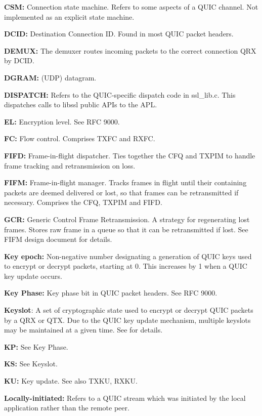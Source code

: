 {\bfseries{CSM\+:}} Connection state machine. Refers to some aspects of a QUIC channel. Not implemented as an explicit state machine.

{\bfseries{DCID\+:}} Destination Connection ID. Found in most QUIC packet headers.

{\bfseries{DEMUX\+:}} The demuxer routes incoming packets to the correct connection QRX by DCID.

{\bfseries{DGRAM\+:}} (UDP) datagram.

{\bfseries{DISPATCH\+:}} Refers to the QUIC-\/specific dispatch code in {\ttfamily ssl\+\_\+lib.\+c}. This dispatches calls to libssl public APIs to the APL.

{\bfseries{EL\+:}} Encryption level. See RFC 9000.

{\bfseries{FC\+:}} Flow control. Comprises TXFC and RXFC.

{\bfseries{FIFD\+:}} Frame-\/in-\/flight dispatcher. Ties together the CFQ and TXPIM to handle frame tracking and retransmission on loss.

{\bfseries{FIFM\+:}} Frame-\/in-\/flight manager. Tracks frames in flight until their containing packets are deemed delivered or lost, so that frames can be retransmitted if necessary. Comprises the CFQ, TXPIM and FIFD.

{\bfseries{GCR\+:}} Generic Control Frame Retransmission. A strategy for regenerating lost frames. Stores raw frame in a queue so that it can be retransmitted if lost. See FIFM design document for details.

{\bfseries{Key epoch\+:}} Non-\/negative number designating a generation of QUIC keys used to encrypt or decrypt packets, starting at 0. This increases by 1 when a QUIC key update occurs.

{\bfseries{Key Phase\+:}} Key phase bit in QUIC packet headers. See RFC 9000.

{\bfseries{Keyslot}}\+: A set of cryptographic state used to encrypt or decrypt QUIC packets by a QRX or QTX. Due to the QUIC key update mechanism, multiple keyslots may be maintained at a given time. See {\ttfamily {}} for details.

{\bfseries{KP\+:}} See Key Phase.

{\bfseries{KS\+:}} See Keyslot.

{\bfseries{KU\+:}} Key update. See also TXKU, RXKU.

{\bfseries{Locally-\/initiated\+:}} Refers to a QUIC stream which was initiated by the local application rather than the remote peer.

